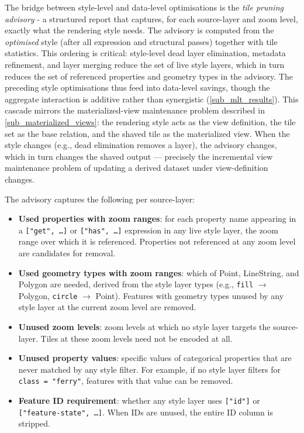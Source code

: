 The bridge between style-level and data-level optimisations is the \emph{tile pruning advisory} - a structured report that captures, for each source-layer and zoom level, exactly what the rendering style needs.
The advisory is computed from the \emph{optimised} style (after all expression and structural passes) together with tile statistics.
This ordering is critical: style-level dead layer elimination, metadata refinement, and layer merging reduce the set of live style layers, which in turn reduces the set of referenced properties and geometry types in the advisory.
The preceding style optimisations thus feed into data-level savings, though the aggregate interaction is additive rather than synergistic (\cref{sub_mlt_results}).
This cascade mirrors the materialized-view maintenance problem described in \cref{sub_materialized_views}: the rendering style acts as the view definition, the tile set as the base relation, and the shaved tile as the materialized view.
When the style changes (e.g., dead elimination removes a layer), the advisory changes, which in turn changes the shaved output --- precisely the incremental view maintenance problem of updating a derived dataset under view-definition changes.

The advisory captures the following per source-layer:

\begin{itemize}
    \item \textbf{Used properties with zoom ranges}: for each property name appearing in a \texttt{["get",~\ldots]} or \texttt{["has",~\ldots]} expression in any live style layer, the zoom range over which it is referenced.
    Properties not referenced at any zoom level are candidates for removal.
    \item \textbf{Used geometry types with zoom ranges}: which of Point, LineString, and Polygon are needed, derived from the style layer types (e.g., \texttt{fill} $\to$ Polygon, \texttt{circle} $\to$ Point).
    Features with geometry types unused by any style layer at the current zoom level are removed.
    \item \textbf{Unused zoom levels}: zoom levels at which no style layer targets the source-layer.
    Tiles at these zoom levels need not be encoded at all.
    \item \textbf{Unused property values}: specific values of categorical properties that are never matched by any style filter.
    For example, if no style layer filters for \texttt{class = "ferry"}, features with that value can be removed.
    \item \textbf{Feature ID requirement}: whether any style layer uses \texttt{["id"]} or \texttt{["feature-state",~\ldots]}.
    When IDs are unused, the entire ID column is stripped.
\end{itemize}


